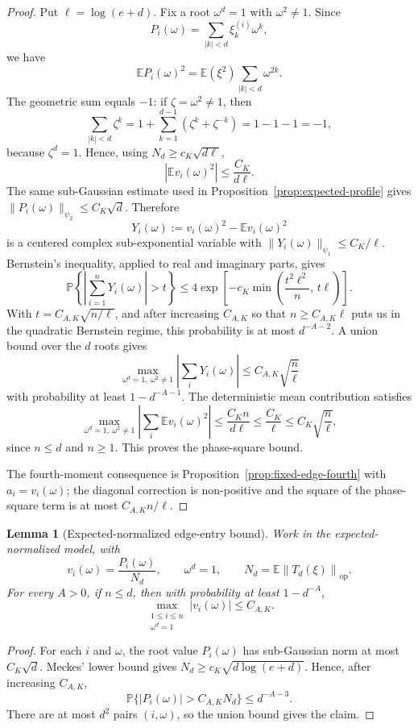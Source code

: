 \documentclass[11pt]{amsart}
\numberwithin{equation}{section}
\newtheorem{lemma}[theorem]{Lemma}
\theoremstyle{definition}
\theoremstyle{remark}
\newcommand{\op}{\mathrm{op}}
\newcommand{\Prob}{\mathbb P}
\newcommand{\Exp}{\mathbb E}
\newcommand{\norm}[1]{\left\lVert #1\right\rVert}
\newcommand{\abs}[1]{\left\lvert #1\right\rvert}
\begin{document}
\begin{proof}
Put \(\ell=\log(e+d)\).  Fix a root \(\omega^d=1\) with \(\omega^2\ne1\).  Since
\[
  P_i(\omega)=\sum_{\abs{k}<d}\xi_k^{(i)}\omega^k,
\]
we have
\[
  \Exp P_i(\omega)^2
  =\Exp(\xi^2)\sum_{\abs{k}<d}\omega^{2k}.
\]
The geometric sum equals \(-1\): if \(\zeta=\omega^2\ne1\), then
\[
  \sum_{\abs{k}<d}\zeta^k
  =1+\sum_{k=1}^{d-1}(\zeta^k+\zeta^{-k})
  =1-1-1=-1,
\]
because \(\zeta^d=1\).  Hence, using \(N_d\ge c_K\sqrt{d\ell}\),
\[
  \left|\Exp v_i(\omega)^2\right|\le \frac{C_K}{d\ell}.
\]
The same sub-Gaussian estimate used in Proposition~\ref{prop:expected-profile}
gives \(\|P_i(\omega)\|_{\psi_2}\le C_K\sqrt d\).  Therefore
\[
  Y_i(\omega):=v_i(\omega)^2-\Exp v_i(\omega)^2
\]
is a centered complex sub-exponential variable with
\(\|Y_i(\omega)\|_{\psi_1}\le C_K/\ell\).  Bernstein's inequality, applied to
real and imaginary parts, gives
\[
  \Prob\left\{\left|\sum_{i=1}^nY_i(\omega)\right|>t\right\}
  \le
  4\exp\left[-c_K\min\left(\frac{t^2\ell^2}{n},\,t\ell\right)\right].
\]
With \(t=C_{A,K}\sqrt{n/\ell}\), and after increasing \(C_{A,K}\) so that
\(n\ge C_{A,K}\ell\) puts us in the quadratic Bernstein regime, this probability
is at most \(d^{-A-2}\).  A union bound over the \(d\) roots gives
\[
  \max_{\omega^d=1,\ \omega^2\ne1}
  \left|\sum_iY_i(\omega)\right|
  \le C_{A,K}\sqrt{\frac n\ell}
\]
with probability at least \(1-d^{-A-1}\).  The deterministic mean contribution
satisfies
\[
  \max_{\omega^d=1,\ \omega^2\ne1}
  \left|\sum_i\Exp v_i(\omega)^2\right|
  \le \frac{C_K n}{d\ell}\le \frac{C_K}{\ell}
  \le C_K\sqrt{\frac n\ell},
\]
since \(n\le d\) and \(n\ge1\).  This proves the phase-square bound.

The fourth-moment consequence is Proposition~\ref{prop:fixed-edge-fourth} with
\(a_i=v_i(\omega)\); the diagonal correction is non-positive and the square of
the phase-square term is at most \(C_{A,K}n/\ell\).
\end{proof}

\begin{lemma}[Expected-normalized edge-entry bound]
\label{lem:expected-entry}
Work in the expected-normalized model, with
\[
  v_i(\omega)=\frac{P_i(\omega)}{N_d},\qquad \omega^d=1,
  \qquad N_d=\Exp\norm{T_d(\xi)}_{\op}.
\]
For every \(A>0\), if \(n\le d\), then with probability at least \(1-d^{-A}\),
\[
  \max_{\substack{1\le i\le n\\ \omega^d=1}}\abs{v_i(\omega)}
  \le C_{A,K}.
\]
\end{lemma}

\begin{proof}
For each \(i\) and \(\omega\), the root value \(P_i(\omega)\) has
sub-Gaussian norm at most \(C_K\sqrt d\).  Meckes' lower bound gives
\(N_d\ge c_K\sqrt{d\log(e+d)}\).  Hence, after increasing \(C_{A,K}\),
\[
  \Prob\{\abs{P_i(\omega)}>C_{A,K}N_d\}\le d^{-A-3}.
\]
There are at most \(d^2\) pairs \((i,\omega)\), so the union bound gives the
claim.
\end{proof}
\end{document}
